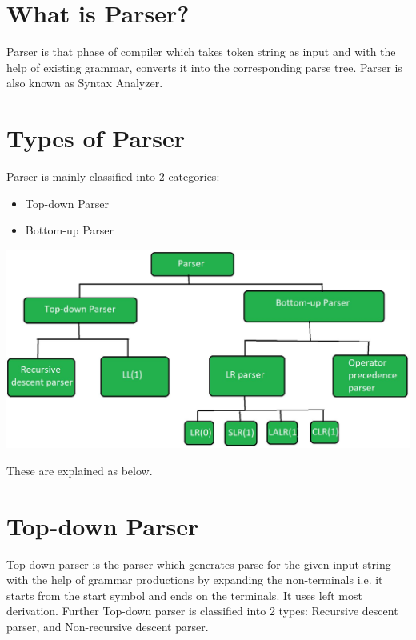 \documentclass[12pt]{article}
\begin{document}
\tableofcontents

\section{What is Parser?}

Parser is that phase of compiler which takes token string as input and with the help of existing grammar, converts it into the corresponding parse tree. Parser is also known as Syntax Analyzer.

\section{Types of Parser}

Parser is mainly classified into 2 categories: 

\begin{itemize}
	\item Top-down Parser
	\item Bottom-up Parser
\end{itemize}

\begin{center}
	\includegraphics[scale=.4]{./parser.jpg}
\end{center}


These are explained as below.


\section{Top-down Parser}

Top-down parser is the parser which generates parse for the given input string with the help of grammar productions by expanding the non-terminals i.e. it starts from the start symbol and ends on the terminals. It uses left most derivation. Further Top-down parser is classified into 2 types: Recursive descent parser, and Non-recursive descent parser.
\end{document}
